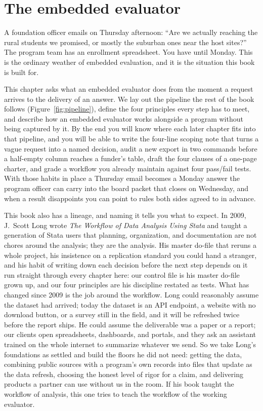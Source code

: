\documentclass[
    a4paper,
    fontsize=10pt,
    twoside=true,
    numbers=noenddot,
]{kaobook}
\begin{document}
\chapter{The embedded evaluator}\label{ch:embedded}

A foundation officer emails on Thursday afternoon: \enquote{Are we actually reaching the rural students we promised, or mostly the suburban ones near the host sites?} The program team has an enrollment spreadsheet. You have until Monday. This is the ordinary weather of embedded evaluation, and it is the situation this book is built for.

This chapter asks what an embedded evaluator does from the moment a request arrives to the delivery of an answer. We lay out the pipeline the rest of the book follows (Figure~\ref{fig:pipeline}), define the four principles every step has to meet, and describe how an embedded evaluator works alongside a program without being captured by it. By the end you will know where each later chapter fits into that pipeline, and you will be able to write the four-line scoping note that turns a vague request into a named decision, audit a new export in two commands before a half-empty column reaches a funder's table, draft the four clauses of a one-page charter, and grade a workflow you already maintain against four pass\slash fail tests. With those habits in place a Thursday email becomes a Monday answer the program officer can carry into the board packet that closes on Wednesday, and when a result disappoints you can point to rules both sides agreed to in advance.

This book also has a lineage, and naming it tells you what to expect. In 2009, J.\ Scott Long wrote \emph{The Workflow of Data Analysis Using Stata} \parencite{long2009workflow} and taught a generation of Stata users that planning, organization, and documentation are not chores around the analysis; they are the analysis. His master do-file that reruns a whole project, his insistence on a replication standard you could hand a stranger, and his habit of writing down each decision before the next step depends on it run straight through every chapter here: our control file is his master do-file grown up, and our four principles are his discipline restated as tests. What has changed since 2009 is the job around the workflow. Long could reasonably assume the dataset had arrived; today the dataset is an API endpoint, a website with no download button, or a survey still in the field, and it will be refreshed twice before the report ships. He could assume the deliverable was a paper or a report; our clients open spreadsheets, dashboards, and portals, and they ask an assistant trained on the whole internet to summarize whatever we send. So we take Long's foundations as settled and build the floors he did not need: getting the data, combining public sources with a program's own records into files that update as the data refresh, choosing the honest level of rigor for a claim, and delivering products a partner can use without us in the room. If his book taught the workflow of analysis, this one tries to teach the workflow of the working evaluator.
\end{document}

